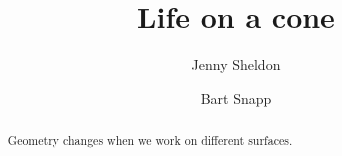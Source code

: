 \documentclass[handout,nooutcomes,noauthor]{ximera}
\title{Life on a cone}
\author{Jenny Sheldon \and Bart Snapp}
\begin{document}
\begin{abstract}
  Geometry changes when we work on different surfaces.
\end{abstract}
\maketitle


\begin{listOutcomes}
\item 
\end{listOutcomes}


\mynewpage



\begin{question}
  
\end{question}

\mynewpage


\begin{question}
\end{question}

\mynewpage


\begin{question}
 \end{question}





\end{document}
